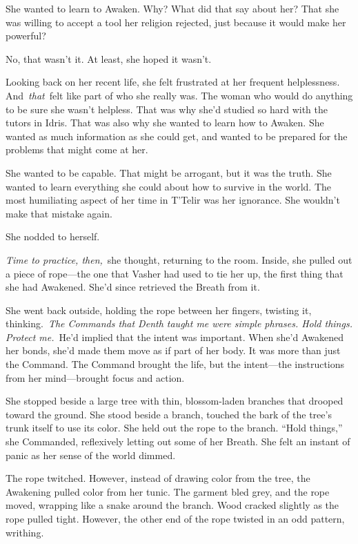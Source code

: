 She wanted to learn to Awaken. Why? What did that say about her? That she was willing to accept a tool her religion rejected, just because it would make her powerful?

No, that wasn’t it. At least, she hoped it wasn’t.

Looking back on her recent life, she felt frustrated at her frequent helplessness. And~\textit{that}~felt like part of who she really was. The woman who would do anything to be sure she wasn’t helpless. That was why she’d studied so hard with the tutors in Idris. That was also why she wanted to learn how to Awaken. She wanted as much information as she could get, and wanted to be prepared for the problems that might come at her.

She wanted to be capable. That might be arrogant, but it was the truth. She wanted to learn everything she could about how to survive in the world. The most humiliating aspect of her time in T’Telir was her ignorance. She wouldn’t make that mistake again.

She nodded to herself.

\textit{Time to practice, then,}~she thought, returning to the room. Inside, she pulled out a piece of rope—the one that Vasher had used to tie her up, the first thing that she had Awakened. She’d since retrieved the Breath from it.

She went back outside, holding the rope between her fingers, twisting it, thinking.~\textit{The Commands that Denth taught me were simple phrases. Hold things. Protect me.}~He’d implied that the intent was important. When she’d Awakened her bonds, she’d made them move as if part of her body. It was more than just the Command. The Command brought the life, but the intent—the instructions from her mind—brought focus and action.

She stopped beside a large tree with thin, blossom-laden branches that drooped toward the ground. She stood beside a branch, touched the bark of the tree’s trunk itself to use its color. She held out the rope to the branch. “Hold things,” she Commanded, reflexively letting out some of her Breath. She felt an instant of panic as her sense of the world dimmed.

The rope twitched. However, instead of drawing color from the tree, the Awakening pulled color from her tunic. The garment bled grey, and the rope moved, wrapping like a snake around the branch. Wood cracked slightly as the rope pulled tight. However, the other end of the rope twisted in an odd pattern, writhing.

